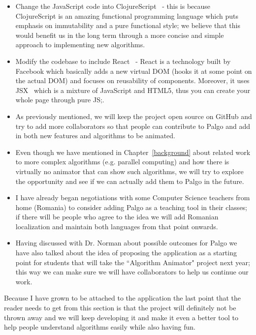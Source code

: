 \documentclass{l4proj}
\begin{document}
\begin{itemize}
  \item Change the JavaScript code into ClojureScript~\cite{clojurescript} - this is because ClojureScript is an
    amazing functional programming language which puts emphasis on immutability and a pure functional style; we
    believe that this would benefit us in the long term through a more concise and simple approach to implementing new
    algorithms.
  \item Modify the codebase to include React~\cite{react} - React is a technology built by Facebook which basically adds a
    new virtual DOM (hooks it at some point on the actual DOM) and focuses on reusability of components. Moreover, it
    uses JSX~\cite{jsx} which is a mixture of JavaScript and HTML5, thus you can create your whole page through pure
    JS;.
  \item As previously mentioned, we will keep the project open source on GitHub and try to add more collaborators so
    that people can contribute to Palgo and add in both new features and algorithms to be animated.
  \item Even though we have mentioned in Chapter~\ref{background} about related work to more complex algorithms (e.g.
    parallel computing) and how there is virtually no animator that can show such algorithms, we will try to explore
    the opportunity and see if we can actually add them to Palgo in the future.
  \item I have already began negotiations with some Computer Science teachers from home (Romania) to consider adding
    Palgo as a teaching tool in their classes; if there will be people who agree to the idea we will add Romanian
    localization and maintain both languages from that point onwards.
  \item Having discussed with Dr. Norman about possible outcomes for Palgo we have also talked about the idea of
    proposing the application as a starting point for students that will take the ``Algorithm Animator" project next
    year; this way we can make sure we will have collaborators to help us continue our work.
\end{itemize}

Because I have grown to be attached to the application the last point that the reader needs to get from this
section is that the project will definitely not be thrown away and we will keep developing it and make it even a
better tool to help people understand algorithms easily while also having fun.
\end{document}
